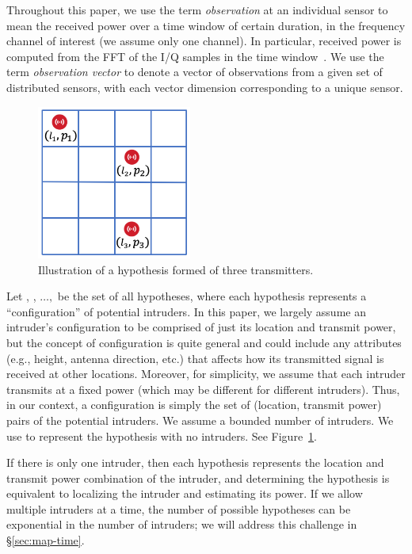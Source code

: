  Throughout this
paper, we use the term {\em observation} at an individual sensor to
mean the received power over a time window of certain duration, in the
frequency channel of interest (we assume only one channel). In
particular, received power is computed from the FFT of the I/Q samples
in the time window~\cite{our-infocom}. We use the term {\em observation
  vector} \vx to denote a vector of observations from a given set of
distributed sensors, with each vector dimension corresponding to a
unique sensor.

\begin{figure}
\includegraphics[width=2in]{chapters/ipsn/figures/hypothesis.png}
\caption{Illustration of a hypothesis formed of three transmitters.}
\label{fig:hypothesis-grid}
\end{figure}
 Let \hz, \ho, $\ldots,$ \hM be the set of all
hypotheses, where each hypothesis \hj represents a ``configuration''
of potential intruders. In this paper, we largely assume an
  intruder's configuration to be comprised of just its location and
  transmit power, but the concept of configuration is quite general
  and could include any attributes (e.g., height, antenna direction,
  etc.) that affects how its transmitted signal is received at other
  locations. Moreover, for simplicity, we assume that each intruder
  transmits at a fixed power (which may be different for different
  intruders). Thus, in our context, a configuration is simply the set
of (location, transmit power) pairs of the potential intruders. We
assume a bounded number of intruders. We use \hz to represent the
hypothesis with no intruders. See Figure~\ref{fig:hypothesis-grid}.

If there is only one intruder, then each hypothesis represents the
location and transmit power combination of the intruder, and
determining the hypothesis is equivalent to localizing the intruder
and estimating its power. If we allow multiple intruders at a time,
the number of possible hypotheses can be exponential in the number of
intruders; we will address this challenge in
\S\ref{sec:map-time}.

